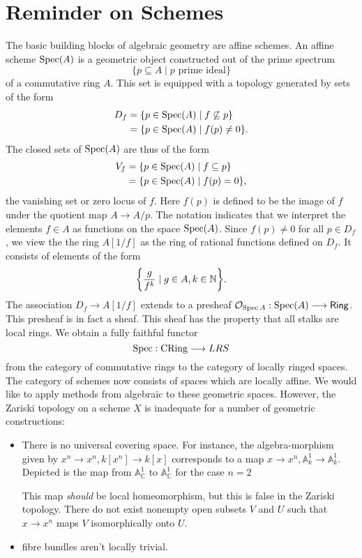 \section{Reminder on Schemes}

The basic building blocks of algebraic geometry are affine schemes. An affine scheme $\operatorname{Spec}(A)$ is a geometric object constructed out of the prime spectrum 
\[
  \{p \subseteq A \mid p \text{ prime ideal}\}
\]
of a commutative ring $A$. This set is equipped with a topology generated by sets of the form 
\begin{align*}
  D_f &= \{ p \in \operatorname{Spec}(A) \mid f \not \subseteq p \} \\
      &= \{ p \in \operatorname{Spec}(A) \mid f(p) \neq 0\} .
\end{align*}
The closed sets of $\operatorname{Spec}(A)$ are thus of the form
\begin{align*}
  V_f &= \{ p \in \operatorname{Spec}(A) \mid f \subseteq p \} \\
      &= \{ p \in \operatorname{Spec}(A) \mid f(p) = 0\} ,
\end{align*}
the vanishing set or zero locus of $f$. Here $f(p)$ is defined to be the image of $f$ under the quotient map $A \to A/p$. The notation indicates that we interpret the elements $f \in A$ as functions on the space $\operatorname{Spec}(A)$. Since $f(p) \neq 0$ for all $p \in D_f$, we view the the ring $A[1/f]$ as the ring of rational functions defined on $D_f$. It consists of elements of the form 
\[
  \biggl\{ \frac{g}{f^k} \mid g \in A, k \in \mathbb{N} \biggr\}.
\]
The association $D_f \to A[1/f]$ extends to a presheaf $\mathcal{O}_{\operatorname{Spec}{A}}: \operatorname{Spec}(A) \longrightarrow \mathsf{Ring}$.
This presheaf is in fact a sheaf. This sheaf has the property that all stalks are local rings. We obtain a fully faithful functor
\[
\operatorname{Spec} : \text{CRing} \longrightarrow LRS
\]
from the category of commutative rings to the category of locally ringed spaces. The category of schemes now consists of spaces which are locally affine. We would like to apply methods from algebraic to these geometric spaces. However, the Zariski topology on a scheme $X$ is inadequate for a number of geometric constructions:

\begin{itemize}
  \item There is no universal covering space.
        For instance, the algebra-morphism given by $x^n \to x^n, k[x^n] \to k[x]$ corresponds to a map $x \to x^n, \mathbb{A}^1_k \to \mathbb{A}^1_k$. Depicted is the map from $\mathbb{A}^1_\mathbb{C}$ to $\mathbb{A}^1_\mathbb{C}$ for the case $n=2$
        \begin{center}
        
        
        \end{center}
        This map \textit{should} be local homeomorphism, but this is false in the Zariski topology. There do not exist nonempty open subsets $V$ and $U$ such that $x \to x^n$ maps $V$ isomorphically onto $U$.
  \item fibre bundles aren't locally trivial.
\end{itemize}
  
